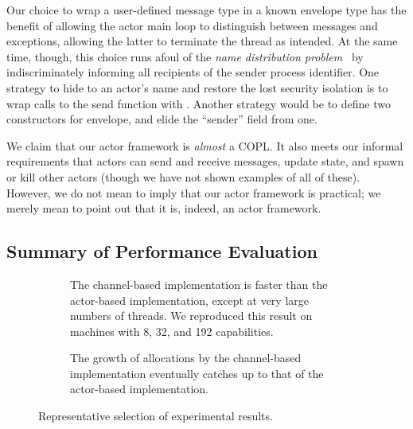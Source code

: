 \documentclass[sigplan,screen]{acmart}
\begin{document}
Our choice to wrap a user-defined message type in a known envelope type has the
benefit of allowing the actor main loop to distinguish between messages and
exceptions, allowing the latter to terminate the thread as intended.
%
At the same time, though, this choice runs afoul of the \emph{name distribution problem}~\cite{armstrong2003} by indiscriminately informing all recipients of the sender
process identifier.
%
One strategy to hide to an actor's name and restore the lost security isolation is
to wrap calls to the send function with .
%
Another strategy would be to define two constructors for envelope, and elide
the ``sender'' field from one.

We claim that our actor framework is \emph{almost} a COPL.
%
It also meets our informal requirements that actors can send and receive
messages, update state, and spawn or kill other actors (though we have not
shown examples of all of these).
%
However, we do not mean to imply that our actor framework is practical; we
merely mean to point out that it is, indeed, an actor framework.





\subsection{Summary of Performance Evaluation}


\begin{figure}
\raggedright

    \begin{subfigure}{\linewidth}
        \begin{small}
        \def\svgwidth{\linewidth}

        \end{small}
        \caption{
            The channel-based implementation is faster than the actor-based
            implementation, except at very large numbers of threads.
            We reproduced this result on machines with 8, 32, and 192 capabilities.
        }
        \label{fig:perf-eval-time-n32}
    \end{subfigure}

    \begin{subfigure}{\linewidth}
        \begin{small}
        \def\svgwidth{\linewidth}

        \end{small}
        \caption{
            The growth of allocations by the channel-based implementation
            eventually catches up to that of the actor-based implementation.
        }
        \label{fig:perf-eval-mem}
    \end{subfigure}

\caption{Representative selection of experimental results.}
\label{fig:perf-eval}
\end{figure}
\end{document}
